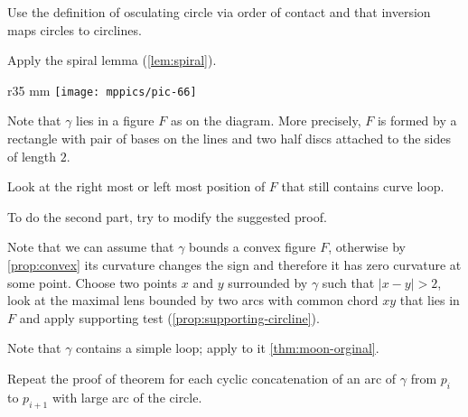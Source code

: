 



Use the definition of osculating circle via order of contact and that inversion maps circles to circlines. 




 Apply the spiral lemma (\ref{lem:spiral}).



\begin{wrapfigure}{r}{35 mm}
\vskip1mm
\centering
\texttt{[image: mppics/pic-66]}
\vskip0mm
\end{wrapfigure}

Note that $\gamma$ lies in a figure $F$ as on the diagram.
More precisely, $F$ is formed by a rectangle with pair of bases on the lines and two half discs attached to the sides of length $2$.

Look at the right most or left most position of $F$ that still contains curve loop.

To do the second part, try to modify the suggested proof.



Note that we can assume that $\gamma$ bounds a convex figure $F$, otherwise by \ref{prop:convex} its curvature changes the sign and therefore it has zero curvature at some point.
Choose two points $x$ and $y$ surrounded by $\gamma$ such that $|x-y|>2$,
look at the maximal lens bounded by two arcs with common chord $xy$ that lies in $F$ and apply supporting test (\ref{prop:supporting-circline}).


 Note that $\gamma$ contains a simple loop; apply to it \ref{thm:moon-orginal}.

Repeat the proof of theorem for each cyclic concatenation of an arc of $\gamma$ from $p_i$ to $p_{i+1}$ with large arc of the circle. 

